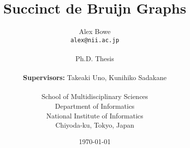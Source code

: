 \documentclass[11pt,a4paper]{report}
\numberwithin{lemma}{chapter}
\numberwithin{theorem}{chapter}
\begin{document}
\title{Succinct de Bruijn Graphs}
\author{Alex Bowe\\
\texttt{alex@nii.ac.jp} \\ \\
Ph.D. Thesis\\ \\
\textbf{Supervisors:} Takeaki Uno, Kunihiko Sadakane\\ \\
School of Multidisciplinary Sciences \\
Department of Informatics \\
National Institute of Informatics \\
Chiyoda-ku, Tokyo, Japan}

\date{\today}

\maketitle


%

\setcounter{tocdepth}{1}
\newpage
\tableofcontents
\newpage














%
%
%
%
%
%

\appendix




%




\end{document}
